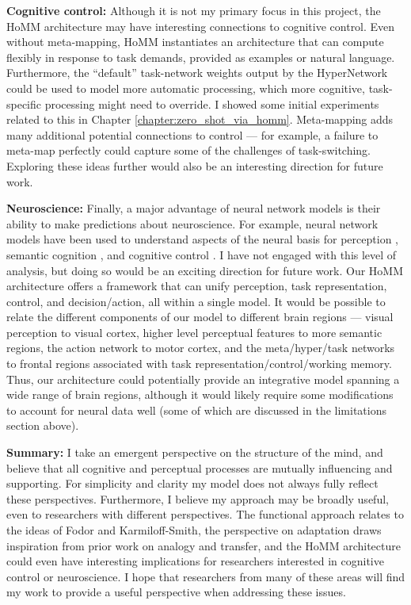 \textbf{Cognitive control:} Although it is not my primary focus in this project, the HoMM architecture may have interesting connections to cognitive control. Even without meta-mapping, HoMM instantiates an architecture that can compute flexibly in response to task demands, provided as examples or natural language. Furthermore, the ``default'' task-network weights output by the HyperNetwork could be used to model more automatic processing, which more cognitive, task-specific processing might need to override. I showed some initial experiments related to this in Chapter \ref{chapter:zero_shot_via_homm}. Meta-mapping adds many additional potential connections to control --- for example, a failure to meta-map perfectly could capture some of the challenges of task-switching. Exploring these ideas further would also be an interesting direction for future work. \par

\textbf{Neuroscience:} Finally, a major advantage of neural network models is their ability to make predictions about neuroscience. For example, neural network models have been used to understand aspects of the neural basis for perception \citep{Yamins2016a}, semantic cognition \citep{Rogers2004}, and cognitive control \citep{Shenhav2013}. I have not engaged with this level of analysis, but doing so would be an exciting direction for future work. Our HoMM architecture offers a framework that can unify perception, task representation, control, and decision/action, all within a single model. It would be possible to relate the different components of our model to different brain regions --- visual perception to visual cortex, higher level perceptual features to more semantic regions, the action network to motor cortex, and the meta/hyper/task networks to frontal regions associated with task representation/control/working memory. Thus, our architecture could potentially provide an integrative model spanning a wide range of brain regions, although it would likely require some modifications to account for neural data well (some of which are discussed in the limitations section above). \par 

\textbf{Summary:} I take an emergent perspective on the structure of the mind, and believe that all cognitive and perceptual processes are mutually influencing and supporting. For simplicity and clarity my model does not always fully reflect these perspectives. Furthermore, I believe my approach may be broadly useful, even to researchers with different perspectives. The functional approach relates to the ideas of Fodor and Karmiloff-Smith, the perspective on adaptation draws inspiration from prior work on analogy and transfer, and the HoMM architecture could even have interesting implications for researchers interested in cognitive control or neuroscience. I hope that researchers from many of these areas will find my work to provide a useful perspective when addressing these issues.

